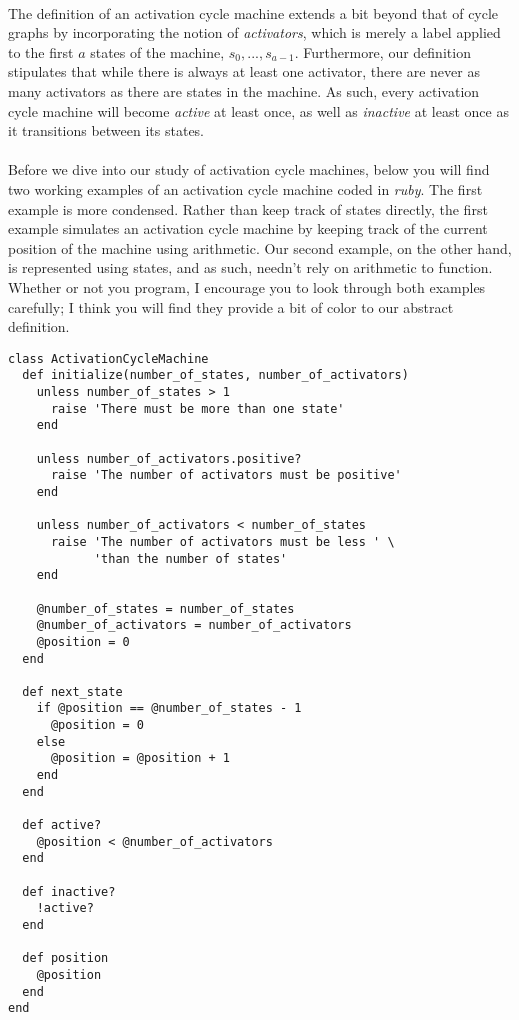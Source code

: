 \documentclass[a4paper,12pt]{article}
\begin{document}
\\
The definition of an activation cycle machine extends a bit beyond that of cycle graphs by incorporating the notion of \textit{activators},  which is merely a label applied to the first $a$ states of the machine, $s_0, ..., s_{a-1}$. Furthermore, our definition stipulates that while there is always at least one activator, there are never as many activators as there are states in the machine. As such, every activation cycle machine will become \textit{active} at least once, as well as \textit{inactive} at least once as it transitions between its states.\\
\\
Before we dive into our study of activation cycle machines, below you will find two working examples of an activation cycle machine coded in \textit{ruby}. The first example is more condensed. Rather than keep track of states directly, the first example simulates an activation cycle machine by keeping track of the current position of the machine using arithmetic. Our second example, on the other hand, is represented using states, and as such, needn't rely on arithmetic to function. Whether or not you program, I encourage you to look through both examples carefully; I think you will find they provide a bit of color to our abstract definition.
\begin{tcolorbox}
\begin{verbatim}
class ActivationCycleMachine
  def initialize(number_of_states, number_of_activators)    
    unless number_of_states > 1
      raise 'There must be more than one state'
    end
    
    unless number_of_activators.positive?
      raise 'The number of activators must be positive'
    end
    
    unless number_of_activators < number_of_states
      raise 'The number of activators must be less ' \
            'than the number of states'
    end
    
    @number_of_states = number_of_states
    @number_of_activators = number_of_activators
    @position = 0
  end

  def next_state
    if @position == @number_of_states - 1
      @position = 0
    else
      @position = @position + 1
    end
  end
  
  def active?
    @position < @number_of_activators
  end
  
  def inactive?
    !active?
  end
  
  def position
    @position
  end
end
\end{verbatim}
\end{tcolorbox}
\end{document}
